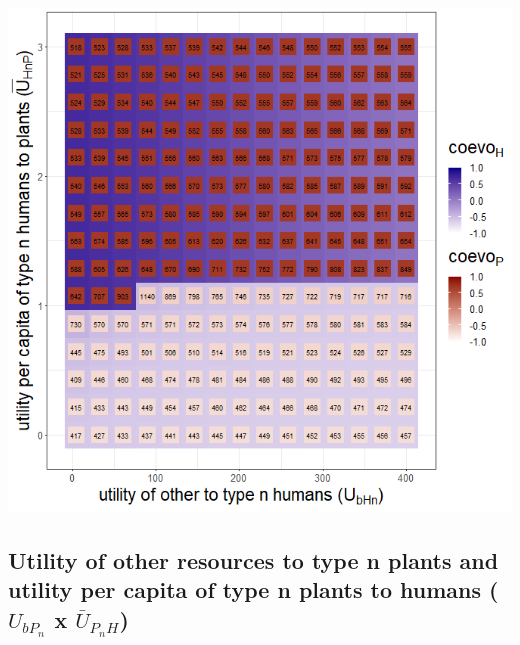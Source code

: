 \documentclass[
]{book}
\begin{document}
\includegraphics[width=1\linewidth]{plots/3_exp_type_n_humans_traits-tripleRaster_twoParameters}

\newpage

\hypertarget{utility-of-other-resources-to-type-n-plants-and-utility-per-capita-of-type-n-plants-to-humans-u_bp_n-x-baru_p_nh}{%
\subsection{\texorpdfstring{Utility of other resources to type n plants and utility per capita of type n plants to humans (\(U_{bP_{n}}\) x \(\bar{U}_{P_{n}H}\))}{Utility of other resources to type n plants and utility per capita of type n plants to humans (U\_\{bP\_\{n\}\} x \textbackslash bar\{U\}\_\{P\_\{n\}H\})}}\label{utility-of-other-resources-to-type-n-plants-and-utility-per-capita-of-type-n-plants-to-humans-u_bp_n-x-baru_p_nh}}
\end{document}
